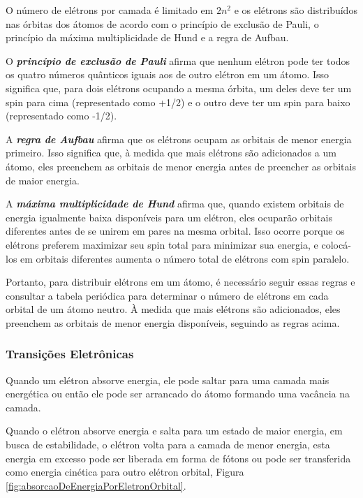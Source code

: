 \documentclass[11pt,a4paper]{article}
\begin{document}
                O número de elétrons por camada é limitado em $2n^2$  e os elétrons são distribuídos nas órbitas dos átomos de acordo com o princípio de exclusão de Pauli, o princípio da máxima multiplicidade de Hund e a regra de Aufbau. 

                O \textbf{\textit{\textcolor{CarnationPink}{princípio de exclusão de Pauli}}} afirma que nenhum elétron pode ter todos os quatro números quânticos iguais aos de outro elétron em um átomo. Isso significa que, para dois elétrons ocupando a mesma órbita, um deles deve ter um spin para cima (representado como +1/2) e o outro deve ter um spin para baixo (representado como -1/2).

                A \textbf{\textit{\textcolor{CarnationPink}{regra de Aufbau}}} afirma que os elétrons ocupam as orbitais de menor energia primeiro. Isso significa que, à medida que mais elétrons são adicionados a um átomo, eles preenchem as orbitais de menor energia antes de preencher as orbitais de maior energia.

                A \textbf{\textit{\textcolor{CarnationPink}{máxima multiplicidade de Hund}}} afirma que, quando existem orbitais de energia igualmente baixa disponíveis para um elétron, eles ocuparão orbitais diferentes antes de se unirem em pares na mesma orbital. Isso ocorre porque os elétrons preferem maximizar seu spin total para minimizar sua energia, e colocá-los em orbitais diferentes aumenta o número total de elétrons com spin paralelo.

                Portanto, para distribuir elétrons em um átomo, é necessário seguir essas regras e consultar a tabela periódica para determinar o número de elétrons em cada orbital de um átomo neutro. À medida que mais elétrons são adicionados, eles preenchem as orbitais de menor energia disponíveis, seguindo as regras acima.


            \subsubsection{Transições Eletrônicas}

                Quando um elétron absorve energia, ele pode saltar para uma camada mais energética ou então ele pode ser arrancado do átomo formando uma vacância na camada. 
                
                Quando o elétron absorve energia e salta para um estado de maior energia, em busca de estabilidade, o elétron volta para a camada de menor energia, esta energia em excesso pode ser liberada em forma de fótons ou pode ser transferida como energia cinética para outro elétron orbital, Figura \ref{fig:absorcaoDeEnergiaPorEletronOrbital}.
\end{document}
